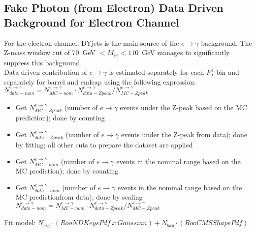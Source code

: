 \subsection{Fake Photon (from Electron) Data Driven Background for Electron Channel}
For the electron channel, DYjets is the main source of the $e \rightarrow \gamma$ background. The Z-mass window cut of $70$~GeV
$<M_{e\gamma}<110$~GeV manages to significantly suppress this background. \\

Data-driven contribution of $e\rightarrow\gamma$ is estimated separately for each $P_{T}^{\gamma}$ bin and separately for barrel and endcap using the following expression:$N_{data-nom}^{e\rightarrow\gamma} = N_{MC-nom}^{e\rightarrow\gamma} \cdot N_{data-Zpeak}^{e\rightarrow\gamma}/N_{MC-Zpeak}^{e\rightarrow\gamma}$ \\

\begin{itemize}
  \item Get $N_{MC-Zpeak}^{e\rightarrow\gamma}$ (number of $e\rightarrow\gamma$ events under the Z-peak based on the MC prediction); done by counting
  \item Get $N_{data-Zpeak}^{e\rightarrow\gamma}$ (number of $e\rightarrow\gamma$ events under the Z-peak from data); done by fitting; all other cuts to prepare the dataset are applied
  \item Get $N_{MC-nom}^{e\rightarrow\gamma}$ (number of $e\rightarrow\gamma$ events in the nominal range based on the MC prediction); done by counting
  \item Get $N_{data-nom}^{e\rightarrow\gamma}$ (number of $e\rightarrow\gamma$ events in the nominal range based on the MC predictionfrom data); done by scaling $N_{data-nom}^{e\rightarrow\gamma} = N_{MC-nom}^{e\rightarrow\gamma} \cdot N_{data-Zpeak}^{e\rightarrow\gamma}/N_{MC-Zpeak}^{e\rightarrow\gamma}$
\end{itemize}

Fit model: $N_{sig} \cdot (RooNDKeysPdf~x~Gaussian) +  N_{bkg} \cdot (RooCMSShapePdf)$\\

